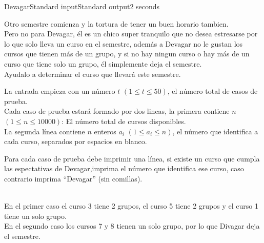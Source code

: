\begin{problem}{Devagar}{Standard input}{Standard output}{2 seconds}


Otro semestre comienza y la tortura de tener un buen horario tambien.\\ Pero no para Devagar, él es un chico super tranquilo que no desea estresarse por lo que solo lleva un curso en el semestre, además a Devagar no le gustan los cursos que tienen más de un grupo, y si no hay ningun curso o hay más de un curso que tiene solo un grupo, él simplemente deja el semestre.\\
Ayudalo a determinar el curso que llevará este semestre.

\InputFile
La entrada empieza con un número $t$ $(1\leq t \leq 50)$, el número total de casos de prueba.\\
Cada caso de prueba estará formado por dos lineas, la primera contiene $n$ $(1\leq n \leq 10000)$: El número total de cursos disponibles.\\
La segunda línea contiene $n$ enteros $a_{i}$ $(1 \leq a_{i} \leq n)$, el número que identifica a cada curso, separados por espacios en blanco. 

\OutputFile
Para cada caso de prueba debe imprimir una línea, si existe un curso que cumpla las espectativas de Devagar,imprima el número que identifica ese curso, caso contrario imprima ``Devagar'' (sin comillas).

\Example

\begin{example}
\end{example}
\\En el primer caso el curso 3 tiene 2 grupos, el curso 5 tiene 2 grupos y el curso 1 tiene un solo grupo.\\
En el segundo caso los cursos 7 y 8 tienen un solo grupo, por lo que Divagar deja el semestre.
\end{problem}
